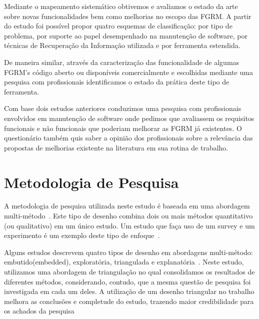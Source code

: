 Mediante o mapeamento sistemático obtivemos e avaliamos o estado da arte sobre
novas funcionalidades bem como melhorias no escopo das FGRM\@. A partir do
estudo foi possível propor quatro esquemas de classificação: por tipo de
problema, por suporte ao papel desempenhado na manutenção de software, por
técnicas de Recuperação da Informação utilizada e por ferramenta
estendida.

De maneira similar, através da caracterização das funcionalidade de algumas
FGRM's código aberto ou disponíveis comercialmente e escolhidas mediante uma
pesquisa com profissionais identificamos o estado da prática deste tipo de
ferramenta.

Com base dois estudos anteriores conduzimos uma pesquisa com profissionais
envolvidos em manutenção de software onde pedimos que avaliassem os requisitos
funcionais e não funcionais que poderiam melhorar as FGRM já existentes. O
questionário também quis saber a opinião dos profissionais sobre a relevância
das propostas de melhorias existente na literatura em sua rotina de
trabalho.

\section{Metodologia de Pesquisa}
\label{sec:intro-metodologia}

A metodologia de pesquisa utilizada neste estudo é baseada em uma abordagem
multi-método~\cite{hesse2010mixed}. Este tipo de desenho  combina
dois ou mais métodos quantitativo (ou qualitativo) em um único estudo. Um estudo
que faça uso de um survey e um experimento é um exemplo deste tipo de
enfoque~\cite{hesse2010mixed}.

Alguns estudos descrevem quatro tipos de desenho em abordagens multi-método:
embutido(embedded), exploratória, triangulada e
explanatória~\cite{creswell2007designing}. Neste estudo, utilizamos uma
abordagem de triangulação no qual consolidamos os resultados de diferentes
métodos, considerando, contudo, que a mesma questão de pesquisa foi investigada
em cada um deles. A utilização de um desenho triangular no trabalho melhora as
conclusões e completude do estudo, trazendo maior credibilidade para os achados
da pesquisa~\cite{hesse2010mixed}

